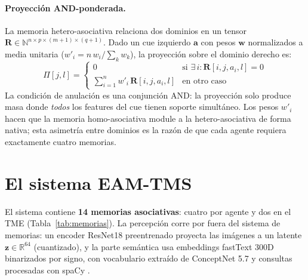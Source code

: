 \documentclass[11pt]{article}
\begin{document}
\paragraph{Proyección AND-ponderada.}
La memoria hetero-asociativa \cite{pineda2024hetero} relaciona dos dominios en
un tensor $\mathbf{R} \in \mathbb{N}^{n \times p \times (m+1) \times (q+1)}$.
Dado un cue izquierdo $\mathbf{a}$ con pesos $\mathbf{w}$ normalizados a media
unitaria ($w'_i = n\, w_i / \sum_k w_k$), la proyección sobre el dominio derecho
es:
\begin{equation}
    \Pi[j, l] = \begin{cases}
        0 & \text{si } \exists\, i : \mathbf{R}[i, j, a_i, l] = 0 \\[4pt]
        \displaystyle\sum_{i=1}^{n} w'_i\, \mathbf{R}[i, j, a_i, l] & \text{en otro caso}
    \end{cases}
    \label{eq:proyeccion-AND}
\end{equation}
La condición de anulación es una conjunción AND: la proyección solo produce
masa donde \emph{todos} los features del cue tienen soporte simultáneo.
Los pesos $w'_i$ hacen que la memoria homo-asociativa module a la
hetero-asociativa de forma nativa; esta asimetría entre dominios es la razón de
que cada agente requiera exactamente cuatro memorias.

\section{El sistema EAM-TMS}

El sistema contiene \textbf{14 memorias asociativas}: cuatro por agente y dos
en el TME (Tabla~\ref{tab:memorias}).
La percepción corre por fuera del sistema de memorias: un encoder ResNet18
\cite{he2016resnet} preentrenado proyecta las imágenes a un latente
$\mathbf{z} \in \mathbb{R}^{64}$ (cuantizado), y la parte semántica usa
embeddings fastText 300D \cite{bojanowski2017fasttext} binarizados por signo,
con vocabulario extraído de ConceptNet 5.7 \cite{speer2017conceptnet} y
consultas procesadas con spaCy \cite{honnibal2020spacy}.
\end{document}
